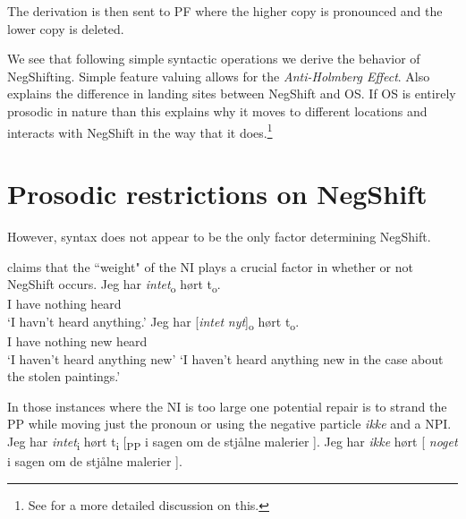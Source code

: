 \documentclass[12pt, letterpaper]{article}
\begin{document}
\ex The derivation is then sent to PF where the higher copy is pronounced and the lower copy is deleted.

\ex We see that following simple syntactic operations we derive the behavior of NegShifting. 
	\ea Simple feature valuing allows for the \emph{Anti-Holmberg Effect}.
	\ex Also explains the difference in landing sites between NegShift and OS.
	\ex If OS is entirely prosodic in nature than this explains why it moves to different locations and interacts with NegShift in the way that it does.\footnote{See \cite{brinkerhoffHolmbergGeneralizationSyntaxprosody2021} for a more detailed discussion on this.} 
	\z  
\z 

\section{Prosodic restrictions on NegShift} \label{sec:PROSODY}

\ea However, syntax does not appear to be the only factor determining NegShift.  

\ex \citet[65f]{christensenInterfacesNegationSyntax2005} claims that the ``weight" of the NI plays a crucial factor in whether or not NegShift occurs. 
	\ea 
	\gll Jeg har \textit{intet}\textsubscript{o} hørt t\textsubscript{o}.\\
	I have nothing heard\\
	\glt  `I havn't heard anything.'
	\ex 
	\gll Jeg har [\textit{intet} \textit{nyt}]\textsubscript{o} hørt t\textsubscript{o}.\\
	I have nothing new heard\\
	\glt `I haven't heard anything new'
	\glt `I haven't heard anything new in the case about the stolen paintings.'
	\z

\ex In those instances where the NI is too large one potential repair is to strand the PP while moving just the pronoun or using the negative particle \textit{ikke} and a NPI.
	\ea Jeg har \textit{intet}\textsubscript{i} hørt t\textsubscript{i} [\textsubscript{PP} i sagen om de stjålne malerier ].
	\ex Jeg har \textit{ikke} hørt [ \textit{noget} i sagen om de stjålne malerier ].
	\z 
 
\end{document}
